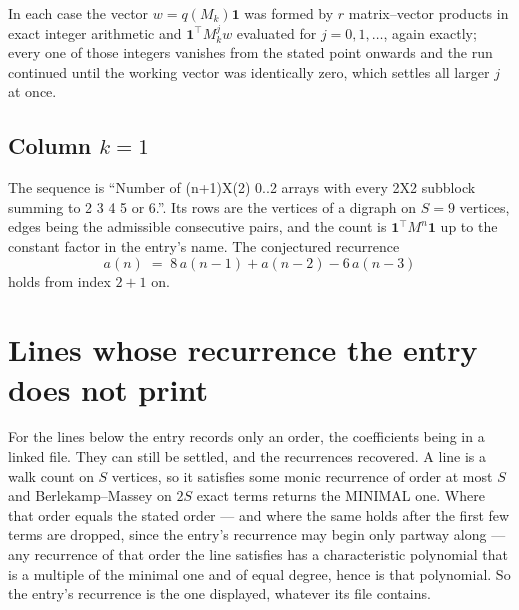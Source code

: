 \documentclass[11pt,a4paper]{article}
\theoremstyle{plain}
\theoremstyle{definition}
\begin{document}
In each case the vector $w=q(M_k)\mathbf{1}$ was formed by $r$ matrix--vector products in
exact integer arithmetic and $\mathbf{1}^{\!\top}M_k^{j}w$ evaluated for $j=0,1,\dots$,
again exactly; every one of those integers vanishes from the stated point onwards and the run
continued until the working vector was identically zero, which settles all larger $j$ at once.

\subsection*{Column $k$$=1$}
The sequence is ``Number of (n+1)X(2) 0..2 arrays with every 2X2 subblock summing to 2 3 4 5 or 6.''. Its rows are the vertices of a digraph on
$S=9$ vertices, edges being the admissible consecutive pairs, and the count is
$\mathbf{1}^{\!\top}M^{n}\mathbf{1}$ up to the constant factor in the entry's name.
The conjectured recurrence
\[
a(n)\;=\;8\,a(n-1) + a(n-2) - 6\,a(n-3)
\]
holds from index $2+1$ on.


\section{Lines whose recurrence the entry does not print}

For the lines below the entry records only an order, the coefficients being in a linked file.
They can still be settled, and the recurrences recovered. A line is a walk count on $S$
vertices, so it satisfies some monic recurrence of order at most $S$ and Berlekamp--Massey on
$2S$ exact terms returns the MINIMAL one. Where that order equals the stated order --- and
where the same holds after the first few terms are dropped, since the entry's recurrence may
begin only partway along --- any recurrence of that order the line satisfies has a
characteristic polynomial that is a multiple of the minimal one and of equal degree, hence is
that polynomial. So the entry's recurrence is the one displayed, whatever its file contains.
\end{document}
